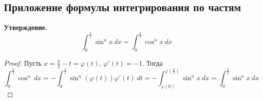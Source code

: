\subsection{Приложение формулы интегрирования по частям}

\textbf{Утверждение.}
\begin{equation*}
  \int_{0}^{\frac{\pi}{2}} \sin^n x \: dx =
  \int_{0}^{\frac{\pi}{2}} \cos^n x \: dx
\end{equation*}
\begin{proof}
    Пусть $x = \frac{\pi}{2} - t = \varphi(t), \, \varphi'(t) = -1$. Тогда
    \begin{equation*}
      \int_{0}^{\frac{\pi}{2}} \cos^n \: dx = -\int_{0}^{\frac{\pi}{2}} \sin^n(\varphi(t))\varphi'(t) \: dt = -\int_{\varphi(0)}^{\varphi(\frac{\pi}{2})} \sin^n x\: dx =\int_{0}^{\frac{\pi}{2}} \sin^n x \: dx
    \end{equation*}
\end{proof}

